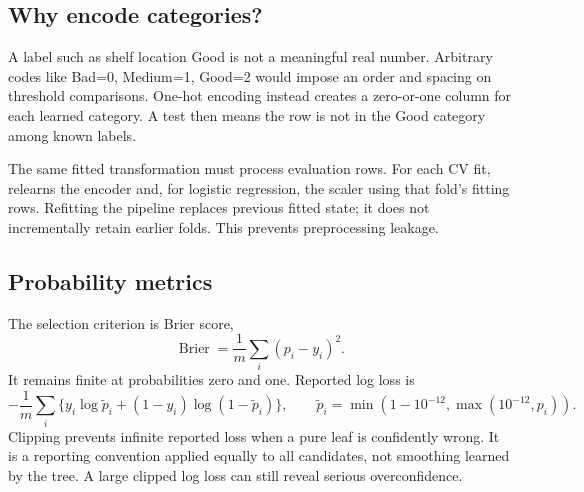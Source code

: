 \subsection*{Why encode categories?}
A label such as shelf location Good is not a meaningful real number. Arbitrary codes like Bad=0, Medium=1, Good=2 would impose an order and spacing on threshold comparisons. One-hot encoding instead creates a zero-or-one column for each learned category. A test  then means the row is not in the Good category among known labels.

The same fitted transformation must process evaluation rows. For each CV fit,  relearns the encoder and, for logistic regression, the scaler using that fold's fitting rows. Refitting the pipeline replaces previous fitted state; it does not incrementally retain earlier folds. This prevents preprocessing leakage.

\subsection*{Probability metrics}
The selection criterion is Brier score,
\[\operatorname{Brier}=\frac1m\sum_i(p_i-y_i)^2.\]
It remains finite at probabilities zero and one. Reported log loss is
\[-\frac1m\sum_i\{y_i\log\tilde p_i+(1-y_i)\log(1-\tilde p_i)\},\qquad
\tilde p_i=\min(1-10^{-12},\max(10^{-12},p_i)).\]
Clipping prevents infinite reported loss when a pure leaf is confidently wrong. It is a reporting convention applied equally to all candidates, not smoothing learned by the tree. A large clipped log loss can still reveal serious overconfidence.

